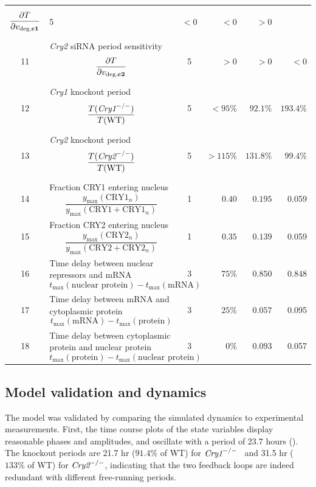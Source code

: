 \begin{longtable}{cp{6.0cm}crrr}
$$\frac{\partial T}{\partial v_{\text{deg,{\bf c1}}}}$$
& 5 & $< 0$ & $< 0$ & $> 0$ \\
%
11 & {\it Cry2} siRNA period sensitivity 
$$\frac{\partial T}{\partial v_{\text{deg,{\bf c2}}}}$$
& 5 & $> 0$ & $> 0$ & $< 0$ \\
%
12 & {\it Cry1} knockout period 
$$\frac{T(\text{\it Cry1}^{-/-})}{T(\text{WT})}$$
& 5 & $< 95 \%$ & $92.1 \%$ & $193.4 \%$ \\
%
13 & {\it Cry2} knockout period 
$$\frac{T(\text{\it Cry2}^{-/-})}{T(\text{WT})}$$
& 5 & $> 115 \%$ & $131.8 \% $ & $99.4 \%$ \\
%
14 & Fraction CRY1 entering nucleus 
$$\frac{y_\text{max}(\text{CRY1}_n)}{y_\text{max}(\text{CRY1} + \text{CRY1}_n)}$$
& 1 & $0.40$ & $0.195$ & 0.059 \\
%
15 & Fraction CRY2 entering nucleus 
$$\frac{y_\text{max}(\text{CRY2}_n)}{y_\text{max}(\text{CRY2} + \text{CRY2}_n)}$$
& 1 & $0.35$ & $0.139$ & 0.059 \\
%
16 & Time delay between nuclear repressors and mRNA 
$$t_\text{max}(\text{nuclear protein}) - t_\text{max}(\text{mRNA})$$
& 3 & $75 \%$ & $0.850$ & 0.848 \\
%
17 & Time delay between mRNA and cytoplasmic protein
$$t_\text{max}(\text{mRNA}) - t_\text{max}(\text{protein})$$ 
& 3 & $25 \%$ & $0.057$ & 0.095 \\
%
18 & Time delay between cytoplasmic protein and nuclear protein
$$t_\text{max}(\text{protein}) - t_\text{max}(\text{nuclear protein})$$
& 3 & $0 \%$ & $0.093$ & 0.057 \\
\end{longtable}

\subsection{Model validation and dynamics}
The model was validated by comparing the simulated dynamics to experimental measurements. 
First, the time course plots of the state variables display reasonable phases and amplitudes, and oscillate with a period of 23.7 hours (). 
The knockout periods are 21.7 hr ($91.4\%$ of WT) for $\text{\it Cry1}^{-/-}$  and 31.5 hr ($133\%$ of WT) for $\text{\it Cry2}^{-/-}$, indicating that the two feedback loops are indeed redundant with different free-running periods.

